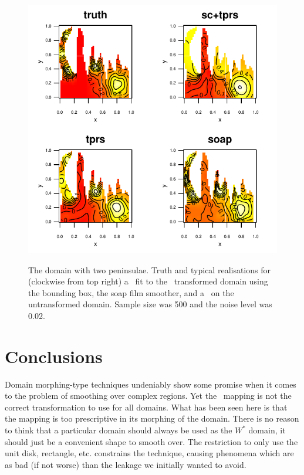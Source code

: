 \begin{figure}
\centering
\includegraphics[width=6in]{sc/figs/wigglytop2-bbox-real.pdf} \\
\caption{The domain with two peninsulae. Truth and typical realisations for (clockwise from top right) a \tprs\ fit to the \sch\ transformed domain using the bounding box, the soap film smoother, and a \tprs\ on the untransformed domain. Sample size was 500 and the noise level was 0.02.}
\label{wigglytop2-bbox-real}
\end{figure}


\section{Conclusions}
\label{sc-conclusions}

Domain morphing-type techniques undeniably show some promise when it comes to the problem of smoothing over complex regions. Yet the \sch\ mapping is not the correct transformation to use for  all domains. What has been seen here is that the mapping is too prescriptive in its morphing of the domain. There is no reason to think that a particular domain should always be used as the $W^*$ domain, it should just be a convenient shape to smooth over. The restriction to only use the unit disk, rectangle, etc. constrains the technique, causing phenomena which are as bad (if not worse) than the leakage we initially wanted to avoid.

